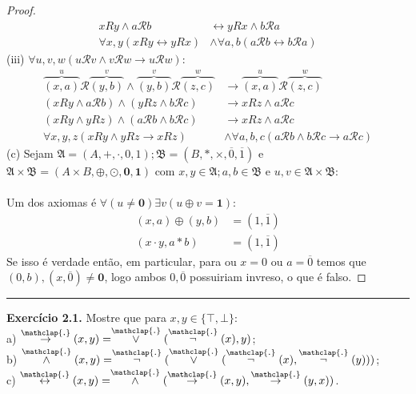 \documentclass[11pt]{article}
\theoremstyle{definition}
\newcommand{\sse}{\leftrightarrow}
\newcommand{\mc}[1]{\mathcal{#1}}
\newcommand{\mf}[1]{\mathfrak{#1}}
\newcommand{\ol}[1]{\overline{#1}}
\newcommand\overtext[2]{\stackrel{\mathclap{\normalfont\mbox{#1}}}{#2}}
\begin{document}
\begin{proof}
\begin{align*}
    xRy\wedge a\mc{R}b & \sse yRx\wedge b\mc{R}a\\
    \forall x,y(xRy\sse yRx) & \wedge \forall a,b(a\mc{R}b\sse b\mc{R}a)
\end{align*}
(iii) $\forall u,v,w(u\mathscr{R} v\wedge v\mathscr{R} w\to u\mathscr{R}w)$:
\begin{align*}
    \overbrace{(x,a)}^u\mathscr{R}\overbrace{(y,b)}^v\wedge \overbrace{(y,b)}^v\mathscr{R}\overbrace{(z,c)}^w & \to \overbrace{(x,a)}^u\mathscr{R}\overbrace{(z,c)}^w\\
    (xRy\wedge a\mc{R}b)\wedge(yRz\wedge b\mc{R}c) & \to xRz\wedge a\mc{R}c\\
    (xRy\wedge yRz)\wedge(a\mc{R}b\wedge b\mc{R}c) & \to xRz\wedge a\mc{R}c\\
    \forall x,y,z(xRy\wedge yRz\to xRz) & \wedge\forall a,b,c(a\mc{R}b\wedge b\mc{R}c\to a\mc{R}c)
\end{align*}
(c) Sejam $\mf{A}=(A,+,\cdot,0,1);\mf{B}=(B,*,\times,\ol{0},\ol{1})$ e $\mf{A}\times\mf{B}=(A\times B,\oplus,\odot,\mathbf{0},\mathbf{1})$ com $x,y\in\mf{A};a,b\in\mf{B}$ e $u,v\in\mf{A}\times\mf{B}$:\\\\
Um dos axiomas é $\forall(u\ne\mathbf{0})\exists v(u\oplus v=\mathbf{1})$:
\begin{align*}
    (x,a)\oplus(y,b) & =(1,\ol{1})\\
    (x\cdot y,a*b) & = (1,\ol{1})
\end{align*}
Se isso é verdade então, em particular, para ou $x=0$ ou $a=\ol{0}$ temos que $(0,b),(x,\ol{0})\ne\mathbf{0}$, logo ambos $0,\ol{0}$ possuiriam invreso, o que é falso.
\end{proof}

\hrule

\textbf{Exercício 2.1.} Mostre que para $x,y\in\{\top,\bot\}$:\\
a) $\overtext{.}{\to}(x,y)=\overtext{.}{\vee}(\overtext{.}{\neg}(x),y)$;\\
b) $\overtext{.}{\wedge}(x,y)=\overtext{.}{\neg}(\overtext{.}{\vee}(\overtext{.}{\neg}(x),\overtext{.}{\neg}(y)))$;\\
c) $\overtext{.}{\leftrightarrow}(x,y)=\overtext{.}{\wedge}(\overtext{.}{\to}(x,y),\overtext{.}{\to}(y,x))$.
\end{document}
